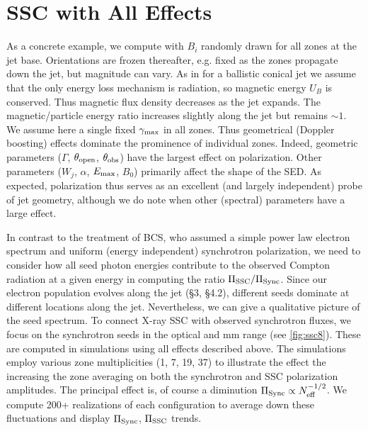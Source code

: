 \section{SSC with All Effects}

As a concrete example, we compute with $B_i$ randomly drawn for all zones at the jet base. Orientations are frozen thereafter, e.g. fixed as the zones propagate down the jet, but magnitude can vary. As in \citet{potter_synchrotron_2012} for a ballistic conical jet we assume that the only energy loss mechanism is radiation, so magnetic energy $U_B$ is conserved. Thus magnetic flux density decreases as the jet expands. The magnetic/particle energy ratio increases slightly along the jet but remains $\sim 1$. We assume here a single fixed $\gamma_{\rm max}$ in all zones. Thus geometrical (Doppler boosting) effects dominate the prominence of individual zones. Indeed, geometric parameters ($\Gamma$, $\theta_{\rm open}$, $\theta_{\rm obs}$) have the largest effect on polarization. Other parameters ($W_j$, $\alpha$, $E_{\rm max}$, $B_0$) primarily affect the shape of the SED. As expected, polarization thus serves as an excellent (and largely independent) probe of jet geometry, although we do note when other (spectral) parameters have a large effect.

In contrast to the treatment of BCS, who assumed a simple power law electron spectrum and uniform (energy independent) synchrotron polarization, we need to consider how all seed photon energies contribute to the observed Compton radiation at a given energy in computing the ratio $\Pi_{\rm SSC}/\Pi_{\rm Sync}$. Since our electron population evolves along the jet (\S3, \S4.2), different seeds dominate at different locations along the jet. Nevertheless, we can give a qualitative picture of the seed spectrum. To connect X-ray SSC with observed synchrotron fluxes, we focus on the synchrotron seeds in the optical and mm range (see \cref{fig:ssc8}). These are computed in simulations using all effects described above. The simulations employ various zone multiplicities (1, 7, 19, 37) to illustrate the effect the increasing the zone averaging on both the synchrotron and SSC polarization amplitudes. The principal effect is, of course a diminution $\Pi_{\rm Sync} \propto N_{\rm eff}^{-1/2}$. We compute 200+ realizations of each configuration to average down these fluctuations and display $\Pi_{\rm Sync}$, $\Pi_{\rm SSC}$ trends.

